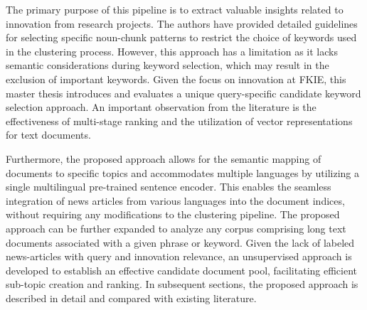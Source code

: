 The primary purpose of this pipeline is to extract valuable insights related to innovation from research projects. The authors have provided detailed guidelines for selecting specific noun-chunk patterns to restrict the choice of keywords used in the clustering process. However, this approach has a limitation as it lacks semantic considerations during keyword selection, which may result in the exclusion of important keywords. Given the focus on innovation at \ac{FKIE}, this master thesis introduces and evaluates a unique query-specific candidate keyword selection approach. An important observation from the literature is the effectiveness of multi-stage ranking and the utilization of vector representations for text documents.

Furthermore, the proposed approach allows for the semantic mapping of documents to specific topics and accommodates multiple languages by utilizing a single multilingual pre-trained sentence encoder. This enables the seamless integration of news articles from various languages into the document indices, without requiring any modifications to the clustering pipeline. The proposed approach can be further expanded to analyze any corpus comprising long text documents associated with a given phrase or keyword. Given the lack of labeled news-articles with query and innovation relevance, an unsupervised approach is developed to establish an effective candidate document pool, facilitating efficient sub-topic creation and ranking. In subsequent sections, the proposed approach is described in detail and compared with existing literature.
